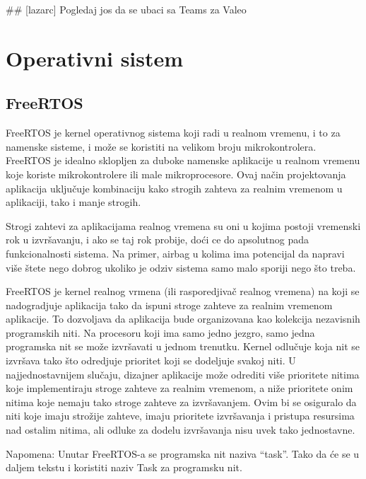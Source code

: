 \documentclass[a4paper,12pt, master]{etf}
\begin{document}
        \#\# [lazarc] Pogledaj jos da se ubaci sa Teams za Valeo

	\newpage

	\chapter{Operativni sistem}

	\section{FreeRTOS}

	FreeRTOS je kernel operativnog sistema koji radi u realnom vremenu, i to za namenske
	sisteme, i mo\v{z}e se koristiti na velikom broju mikrokontrolera. FreeRTOS je idealno sklopljen
	za duboke namenske aplikacije u realnom vremenu koje koriste mikrokontrolere ili male mikroprocesore.
	Ovaj na\v{c}in projektovanja aplikacija uklju\v{c}uje kombinaciju kako strogih zahteva za realnim
	vremenom u aplikaciji, tako i manje strogih.

	Strogi zahtevi za aplikacijama realnog vremena su oni u kojima postoji vremenski rok u
	izvr\v{s}avanju, i ako se taj rok probije, do\'{c}i ce do apsolutnog pada funkcionalnosti sistema.
	Na primer, airbag u kolima ima potencijal da napravi vi\v{s}e \v{s}tete nego dobrog ukoliko je
	odziv sistema samo malo sporiji nego \v{s}to treba.

	FreeRTOS je kernel realnog vrmena (ili rasporedjiva\v{c} realnog
	vremena) na	koji se nadogradjuje aplikacija tako da ispuni stroge zahteve za realnim
	vremenom aplikacije. To dozvoljava da aplikacija bude organizovana kao kolekcija
	nezavisnih programskih niti. Na	procesoru koji ima samo jedno jezgro, samo jedna
	programska nit se mo\v{z}e izvr\v{s}avati u jednom trenutku. Kernel odlu\v{c}uje koja nit se
	izvr\v{s}ava tako \v{s}to odredjuje prioritet koji se dodeljuje svakoj niti. U najjednostavnijem
	slu\v{c}aju, dizajner aplikacije mo\v{z}e odrediti vi\v{s}e prioritete nitima koje implementiraju stroge
	zahteve za realnim vremenom, a ni\v{z}e prioritete onim nitima koje nemaju tako stroge zahteve
	za izvr\v{s}avanjem. Ovim bi se osiguralo da niti koje imaju stro\v{z}ije zahteve, imaju
	prioritete izvr\v{s}avanja i pristupa resursima nad ostalim nitima, ali odluke za dodelu
	izvr\v{s}avanja nisu uvek tako jednostavne.

	Napomena: Unutar FreeRTOS-a se programska nit naziva ``task''. Tako da \'{c}e se u daljem tekstu
	i koristiti naziv Task za programsku nit.
\end{document}
